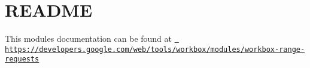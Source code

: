 \chapter{README}
\hypertarget{md_node__modules_2workbox-range-requests_2README}{}\label{md_node__modules_2workbox-range-requests_2README}
This module\textquotesingle{}s documentation can be found at \href{https://developers.google.com/web/tools/workbox/modules/workbox-range-requests}{\texttt{ https\+://developers.\+google.\+com/web/tools/workbox/modules/workbox-\/range-\/requests}} 